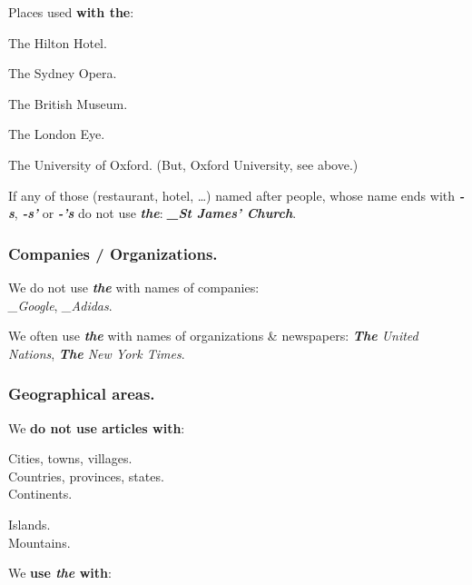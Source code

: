 \documentclass[10pt,a4paper]{article}
\newlength{\OriginalParIndent}
\newcommand\ex[1]{\textit{\textbf{{#1}}}}           %
\newcommand\za{\_\thinspace }                       %
\begin{document}
\vspace{2mm}
Places used \textbf{with the}:
\begin{description}[leftmargin=3.9cm,rightmargin=\OriginalParIndent,style=nextline,before={\renewcommand\makelabel[1]{##1:}}]
  \item[Hotels] The Hilton Hotel.
  \item[Theaters, cinemas, operas] The Sydney Opera.
  \item[Museums] The British Museum.
  \item[Monuments, towers] The London Eye.
  \item[Names with ``of''] The University of Oxford. (But, Oxford University, see above.)
\end{description}
\vspace{-\parskip}
If any of those (restaurant, hotel, \dots) named after people, whose name ends with \ex{-s}, \ex{-s’} or \ex{-’s} do not use \ex{the}: \ex{\za St James’ Church}.



\subsubsection{Companies / Organizations.}
We do not use \ex{the} with names of companies:\\
\textit{\za Google}, \textit{\za Adidas}.

We often use \ex{the} with names of organizations \& newspapers:
\textit{\ex{The} United Nations}, \textit{\ex{The} New York Times}.



\subsubsection{Geographical areas.}
We \textbf{do not use articles with}:

\hspace{\OriginalParIndent}\begin{minipage}{0.55\linewidth}
Cities, towns, villages.\\
Countries, provinces, states.\\
Continents.
\end{minipage}
\begin{minipage}{0.3\linewidth}
Islands.\\
Mountains.
\end{minipage}\vspace{\parskip}


We \textbf{use \ex{the} with}:
\end{document}
